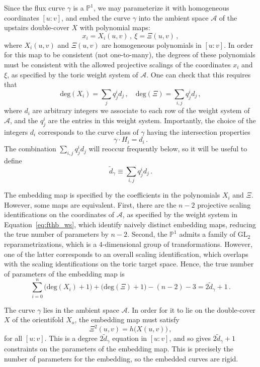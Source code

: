 \documentclass[a4paper,12pt]{article}
\numberwithin{equation}{section}
\newcommand{\mc}{\mathcal}
\newcommand{\mbb}{\mathbb}
\newcommand{\be}{\begin{equation}}
\newcommand{\ee}{\end{equation}}
\newcommand{\cyu}{X}					%
\newcommand{\cyo}{X_o}				%
\newcommand{\as}{\mc{A}}				%
\newcommand{\crv}{\gamma}			%
\newcommand{\degr}[1]{\tilde{d}_{#1}}			%
\begin{document}
Since the flux curve $\crv$ is a $\mbb{P}^1$, we may parameterize it with homogeneous coordinates $[u:v]$, and embed the curve $\crv$ into the ambient space $\as$ of the upstairs double-cover $\cyu$ with polynomial maps:
\be
x_i = X_i(u,v) \,, ~ \xi = \Xi(u,v) \,,
\ee
where $X_i(u,v)$ and $\Xi(u,v)$ are homogeneous polynomials in $[u:v]$. In order for this map to be consistent (not one-to-many), the degrees of these polynomials must be consistent with the allowed projective scalings of the coordinates $x_i$ and $\xi$, as specified by the toric weight system of $\as$. One can check that this requires that
\be
\mathrm{deg}(X_i) = \sum_j q_j^i d_j \,, \quad \mathrm{deg}(\Xi) = \sum_{i,j} q_j^i d_j \,,
\ee
where $d_i$ are arbitrary integers we associate to each row of the weight system of $\as$, and the $q_j^i$ are the entries in this weight system. Importantly, the choice of the integers $d_i$ corresponds to the curve class of $\crv$ having the intersection properties
\be
\crv \cdot H_i = d_i \,.
\label{eq:crv_ints}
\ee
The combination $\sum_{i,j} q_j^i d_j$ will reoccur frequently below, so it will be useful to define
\be
\degr{\crv} \equiv \sum_{i,j} q_j^i d_j \,.
\ee

The embedding map is specified by the coefficients in the polynomials $X_i$ and $\Xi$. However, some maps are equivalent. First, there are the $n-2$ projective scaling identifications on the coordinates of $\as$, as specified by the weight system in Equation~\eqref{eq:fthb_ws}, which identify naively distinct embedding maps, reducing the true number of parameters by $n-2$. Second, the $\mbb{P}^1$ admits a family of $\mathrm{GL}_2$ reparametrizations, which is a 4-dimensional group of transformations. However, one of the latter corresponds to an overall scaling identification, which overlaps with the scaling identifications on the toric target space. Hence, the true number of parameters of the embedding map is
\be
\sum_{i=0}^n \big(\mathrm{deg}(X_i)+1\big) + \big(\mathrm{deg}(\Xi)+1\big) - (n-2) - 3 = 2\degr{\crv}  + 1 \,.
\ee

The curve $\crv$ lies in the ambient space $\as$. In order for it to lie on the double-cover $\cyu$ of the orientifold $\cyo$, the embedding map must satisfy
\be
\Xi^2(u,v) = h\big(X(u,v)\big) \,,
\ee
for all $[u:v]$. This is a degree $2\degr{\crv} $ equation in $[u:v]$, and so gives $2\degr{\crv} +1$ constraints on the parameters of the embedding map. This is precisely the number of parameters for the embedding, so the embedded curves are rigid.
\end{document}
